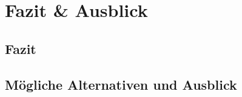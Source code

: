 \chapter{Fazit \& Ausblick}
\label{cha:Fazit}

\section{Fazit}
\section{Mögliche Alternativen und Ausblick}

